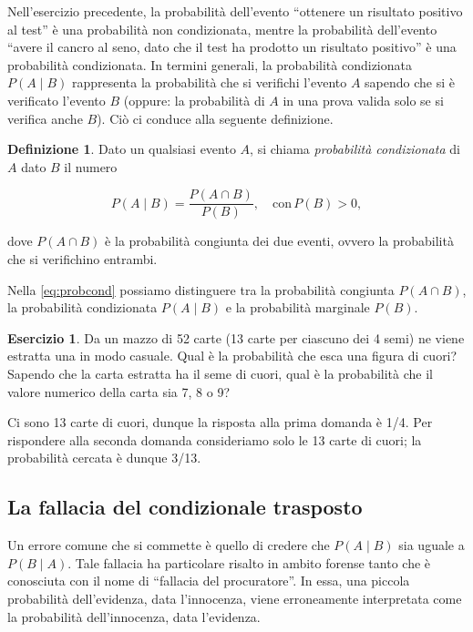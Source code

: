 \documentclass[
  11pt,
]{krantz}
\theoremstyle{definition}
\newtheorem{definition}{Definizione}[chapter]
\theoremstyle{definition}
\theoremstyle{definition}
\newtheorem{exercise}{Esercizio}[chapter]
\theoremstyle{definition}
\theoremstyle{remark}
\begin{document}
Nell'esercizio precedente, la probabilità dell'evento ``ottenere un risultato positivo al test'' è una probabilità non condizionata, mentre la probabilità dell'evento ``avere il cancro al seno, dato che il test ha prodotto un risultato positivo'' è una probabilità condizionata. In termini generali, la probabilità condizionata \(P(A \mid B)\) rappresenta la probabilità che si verifichi l'evento \(A\) sapendo che si è verificato l'evento \(B\) (oppure: la probabilità di \(A\) in una prova valida solo se si verifica anche \(B\)). Ciò ci conduce alla seguente definizione.

\begin{definition}
Dato un qualsiasi evento \(A\), si chiama \emph{probabilità condizionata} di \(A\) dato \(B\) il numero

\begin{equation}
P(A \mid B) = \frac{P(A \cap B)}{P(B)}, \quad \text{con}\, P(B) > 0,
\label{eq:probcond}
\end{equation}

dove \(P(A\cap B)\) è la probabilità congiunta dei due eventi, ovvero la probabilità che si verifichino entrambi.
\end{definition}

Nella \eqref{eq:probcond} possiamo distinguere tra la probabilità congiunta \(P(A \cap B)\), la probabilità condizionata \(P(A \mid B)\) e la probabilità marginale \(P(B)\).

\begin{exercise}
Da un mazzo di 52 carte (13 carte per ciascuno dei 4 semi) ne viene estratta una in modo casuale. Qual è la probabilità che esca una figura di cuori? Sapendo che la carta estratta ha il seme di cuori, qual è la probabilità che il valore numerico della carta sia 7, 8 o 9?

Ci sono 13 carte di cuori, dunque la risposta alla prima domanda è 1/4. Per rispondere alla seconda domanda consideriamo solo le 13 carte di cuori; la probabilità cercata è dunque 3/13.
\end{exercise}

\hypertarget{la-fallacia-del-condizionale-trasposto}{%
\subsection{La fallacia del condizionale trasposto}\label{la-fallacia-del-condizionale-trasposto}}

Un errore comune che si commette è quello di credere che \(P(A \mid B)\) sia uguale a \(P(B \mid A)\). Tale fallacia ha particolare risalto in ambito forense tanto che è conosciuta con il nome di ``fallacia del procuratore''. In essa, una piccola probabilità dell'evidenza, data l'innocenza, viene erroneamente interpretata come la probabilità dell'innocenza, data l'evidenza.
\end{document}

